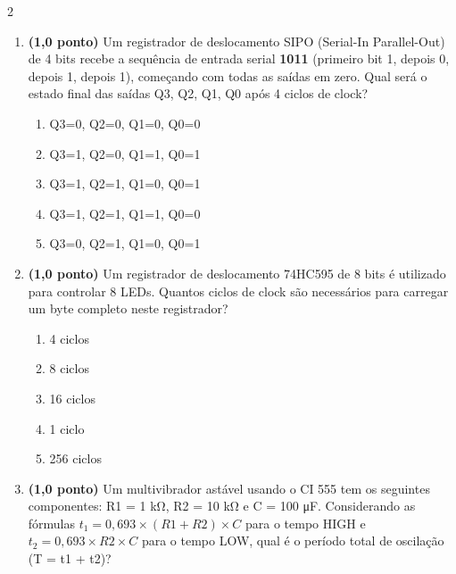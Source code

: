 \documentclass[a4paper,12pt]{article}
\begin{document}
\begin{multicols}{2}
\begin{enumerate}[leftmargin=*]
\vspace{0.2cm}


\item \textbf{(1,0 ponto)} Um registrador de deslocamento SIPO (Serial-In Parallel-Out) de 4 bits recebe a sequência de entrada serial \textbf{1011} (primeiro bit 1, depois 0, depois 1, depois 1), começando com todas as saídas em zero. Qual será o estado final das saídas Q3, Q2, Q1, Q0 após 4 ciclos de clock?

\begin{enumerate}[label=(\Alph*)]
    \item Q3=0, Q2=0, Q1=0, Q0=0
    \item Q3=1, Q2=0, Q1=1, Q0=1
    \item Q3=1, Q2=1, Q1=0, Q0=1
    \item Q3=1, Q2=1, Q1=1, Q0=0
    \item Q3=0, Q2=1, Q1=0, Q0=1
\end{enumerate}

\vspace{0.2cm}


\item \textbf{(1,0 ponto)} Um registrador de deslocamento 74HC595 de 8 bits é utilizado para controlar 8 LEDs. Quantos ciclos de clock são necessários para carregar um byte completo neste registrador?

\begin{enumerate}[label=(\Alph*)]
    \item 4 ciclos
    \item 8 ciclos
    \item 16 ciclos
    \item 1 ciclo
    \item 256 ciclos
\end{enumerate}

\vspace{0.2cm}


\item \textbf{(1,0 ponto)} Um multivibrador astável usando o CI 555 tem os seguintes componentes: R1 = 1 kΩ, R2 = 10 kΩ e C = 100 μF. Considerando as fórmulas $t_1 = 0,693 \times (R1 + R2) \times C$ para o tempo HIGH e $t_2 = 0,693 \times R2 \times C$ para o tempo LOW, qual é o período total de oscilação (T = t1 + t2)?


\end{enumerate}
\end{multicols}
\end{document}
